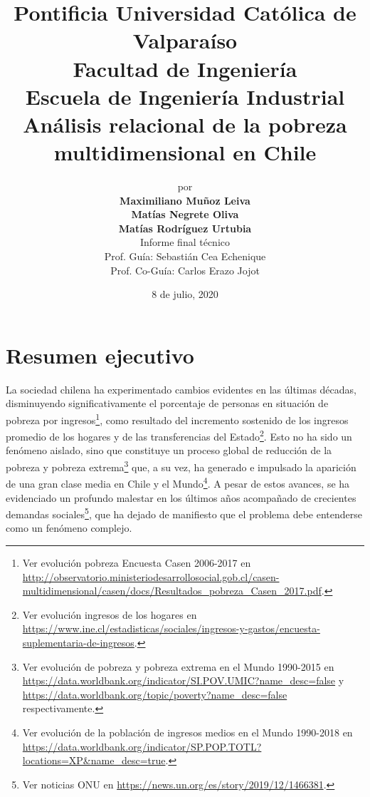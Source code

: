 \documentclass[12pt,letterpaper,spanish]{article}
\title{
Pontificia Universidad Católica de Valparaíso\\
Facultad de Ingeniería\\
Escuela de Ingeniería Industrial\vspace{3em}\\
\textbf{Análisis relacional de la pobreza multidimensional en Chile}} %
\author{\LARGE{por}\vspace{1em}\\
\textbf{\LARGE{Maximiliano Muñoz Leiva}}\vspace{1.5mm}\\
\textbf{\LARGE{Matías Negrete Oliva}}\vspace{1.5mm}\\
\textbf{\LARGE{Matías Rodríguez Urtubia}}\vspace{3em}\\
\LARGE{Informe final técnico}\vspace{2em}\\
\LARGE{Prof. Guía: Sebastián Cea Echenique}\vspace{1em}\\
\LARGE{Prof. Co-Guía: Carlos Erazo Jojot}\vspace{3em}}
\date{\LARGE{8 de julio, 2020}}
\begin{document}
\renewcommand{\listtablename}{Lista de Tablas}%
\renewcommand{\listfigurename}{Lista de Figuras} %


\maketitle
\thispagestyle{empty}
\pagestyle{fancy}
\setlength{\parindent}{1cm} %
\setlength{\parskip}{1em}
\newpage
\begin{center}%
\tableofcontents
\clearpage
\listoffigures
\clearpage
\clearpage
\end{center}%

\section*{Resumen ejecutivo} %
La sociedad chilena ha experimentado cambios evidentes en las últimas décadas, disminuyendo significativamente el porcentaje de personas en situación de pobreza por ingresos\footnote{Ver evolución pobreza Encuesta Casen 2006-2017 en \url{http://observatorio.ministeriodesarrollosocial.gob.cl/casen-multidimensional/casen/docs/Resultados_pobreza_Casen_2017.pdf}.}, como resultado del incremento sostenido de los ingresos promedio de los hogares y de las transferencias del Estado\footnote{Ver evolución ingresos de los hogares en \url{https://www.ine.cl/estadisticas/sociales/ingresos-y-gastos/encuesta-suplementaria-de-ingresos}.}. Esto no ha sido un fenómeno aislado, sino que constituye un proceso global de reducción de la pobreza y pobreza extrema\footnote{Ver evolución de pobreza y pobreza extrema en el Mundo 1990-2015 en \url{https://data.worldbank.org/indicator/SI.POV.UMIC?name_desc=false} y \url{https://data.worldbank.org/topic/poverty?name_desc=false} respectivamente.} que, a su vez, ha generado e impulsado la aparición de una gran clase media en Chile \cite{Candia2017RadiografiaPublica} y el Mundo\footnote{Ver evolución de la población de ingresos medios en el Mundo 1990-2018 en \url{https://data.worldbank.org/indicator/SP.POP.TOTL?locations=XP&name_desc=true}.}. A pesar de estos avances, se ha evidenciado un profundo malestar en los últimos años acompañado de crecientes demandas sociales\footnote{Ver noticias ONU en \url{https://news.un.org/es/story/2019/12/1466381}.}, que ha dejado de manifiesto que el problema debe entenderse como un fenómeno complejo.  
\end{document}
